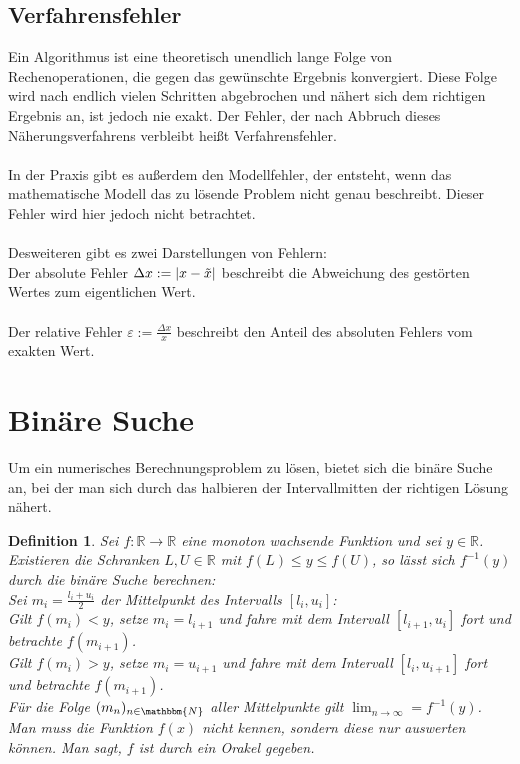 \documentclass[12pt]{article}
\newcommand{\N}{\mathbbm{N}} %
\newcommand{\R}{\mathbb{R}} %
\newtheorem{definition}[satz]{Definition}
\begin{document}
\subsection*{Verfahrensfehler}
Ein Algorithmus ist eine theoretisch unendlich lange Folge von Rechenoperationen, die gegen das gewünschte Ergebnis konvergiert. Diese Folge wird nach endlich vielen Schritten abgebrochen und nähert sich dem richtigen Ergebnis an, ist jedoch nie exakt. Der Fehler, der nach Abbruch dieses Näherungsverfahrens verbleibt heißt Verfahrensfehler. \\ 
\\
In der Praxis gibt es außerdem den Modellfehler, der entsteht, wenn das mathematische Modell das zu lösende Problem nicht genau beschreibt. Dieser Fehler wird hier jedoch nicht betrachtet. \\ 
\\
Desweiteren gibt es zwei Darstellungen von Fehlern: \\
Der absolute Fehler $\Delta x:=|x- \Tilde{x}|$ beschreibt die Abweichung des gestörten Wertes zum eigentlichen Wert. \\
\\
Der relative Fehler $\varepsilon:= \frac{\Delta x}{x}$ beschreibt den Anteil des absoluten Fehlers vom exakten Wert. 

\newpage
\section{Binäre Suche}
Um ein numerisches Berechnungsproblem zu lösen, bietet sich die binäre Suche an, bei der man sich durch das halbieren der Intervallmitten der richtigen Lösung nähert.
\begin{definition} 
   Sei $f: \R \to \R$ eine monoton wachsende Funktion und sei $y \in \R$. Existieren die Schranken $L,U \in \R$ mit $f(L) \leq y \leq f(U)$, so lässt sich $f^{-1}(y)$ durch die binäre Suche berechnen: \\
   Sei $m_i= \frac{l_i+u_i}{2}$ der Mittelpunkt des Intervalls $[l_i,u_i]$: \\
   Gilt $f(m_i)< y$, setze $m_i=l_{i+1}$ und fahre mit dem Intervall $[l_{i+1},u_i]$ fort und betrachte $f(m_{i+1})$. \\
   Gilt $f(m_i)>y$, setze $m_i=u_{i+1}$ und fahre mit dem Intervall $[l_i,u_{i+1}]$ fort und betrachte $f(m_{i+1})$. \\ 
   Für die Folge $(m_n)_{n \in \N}$ aller Mittelpunkte gilt $\lim_{n \to \infty} =f^{-1}(y)$.
   Man muss die Funktion $f(x)$ nicht kennen, sondern diese nur auswerten können. Man sagt, $f$ ist durch ein Orakel gegeben.
\end{definition}
\end{document}
